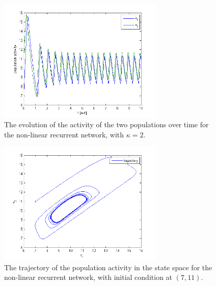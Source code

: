 \documentclass{scrartcl}
\begin{document}
\begin{figure}
\centering
\includegraphics[trim = {0.8cm 0 0.5cm 0.2cm}, width=0.7\textwidth, clip]{../pics/nonlin}
\caption{The evolution of the activity of the two populations over time for the non-linear recurrent network, with $\kappa = 2$.}
\label{label}
\end{figure}

\begin{figure}
\centering
\includegraphics[trim = {0.8cm 0 0.5cm 0.2cm}, width=0.7\textwidth, clip]{../pics/nonlintraj}
\caption{The trajectory of the population activity in the state space for the non-linear recurrent network, with initial condition at $(7, 11)$.}
\label{label}
\end{figure}


\end{document}
